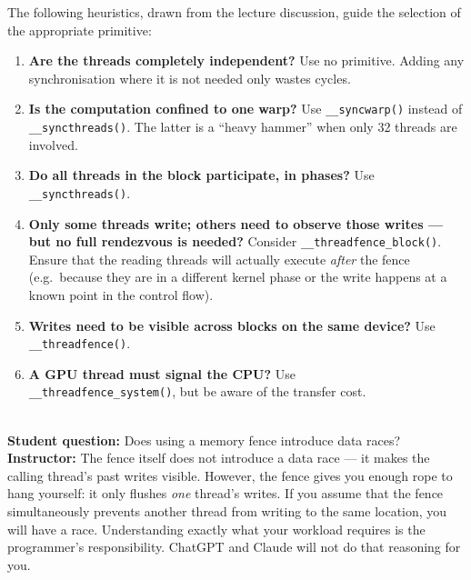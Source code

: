 The following heuristics, drawn from the lecture discussion, guide the
selection of the appropriate primitive:

\begin{enumerate}
  \item \textbf{Are the threads completely independent?} Use no primitive.
        Adding any synchronisation where it is not needed only wastes cycles.

  \item \textbf{Is the computation confined to one warp?} Use
        \texttt{\_\_syncwarp()} instead of \texttt{\_\_syncthreads()}. The
        latter is a ``heavy hammer'' when only 32 threads are involved.

  \item \textbf{Do all threads in the block participate, in phases?} Use
        \texttt{\_\_syncthreads()}.

  \item \textbf{Only some threads write; others need to observe those
        writes --- but no full rendezvous is needed?} Consider
        \texttt{\_\_threadfence\_block()}. Ensure that the reading threads
        will actually execute \emph{after} the fence (e.g.\ because they are
        in a different kernel phase or the write happens at a known point in
        the control flow).

  \item \textbf{Writes need to be visible across blocks on the same device?}
        Use \texttt{\_\_threadfence()}.

  \item \textbf{A GPU thread must signal the CPU?} Use\\
        \texttt{\_\_threadfence\_system()}, but be aware of the transfer cost.
\end{enumerate}

\begin{ppnote}
  \\\textbf{Student question:} Does using a memory fence introduce data races?\\[4pt]
  \textbf{Instructor:} The fence itself does not introduce a data race --- it
  makes the calling thread's past writes visible. However, the fence gives
  you enough rope to hang yourself: it only flushes \emph{one} thread's
  writes. If you assume that the fence simultaneously prevents another thread
  from writing to the same location, you will have a race. Understanding
  exactly what your workload requires is the programmer's responsibility.
  ChatGPT and Claude will not do that reasoning for you.
\end{ppnote}

